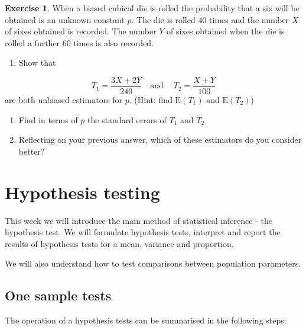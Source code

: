 \documentclass[
]{book}
\providecommand{\tightlist}{%
  \setlength{\itemsep}{0pt}\setlength{\parskip}{0pt}}
\theoremstyle{definition}
\theoremstyle{definition}
\theoremstyle{definition}
\newtheorem{exercise}{Exercise}[chapter]
\theoremstyle{definition}
\theoremstyle{remark}
\begin{document}
\begin{exercise}

When a biased cubical die is rolled the probability that a six will be obtained is an unknown constant \(p\). The die is rolled \(40\) times and the number \(X\) of sixes obtained is recorded. The number \(Y\) of sixes obtained when the die is rolled a further \(60\) times is also recorded.

\begin{enumerate}
\def\labelenumi{\alph{enumi})}
\tightlist
\item
  Show that
\end{enumerate}

\[T_1 = \frac{3X+2Y}{240} \ \ \ \text{    and  } \ \ \ \ T_2 = \frac{X+Y}{100} \]
are both unbiased estimators for \(p\).
(Hint: find \(\text{E}(T_1)\) and \(\text{E}(T_2)\))

\begin{enumerate}
\def\labelenumi{\alph{enumi})}
\setcounter{enumi}{1}
\item
  Find in terms of \(p\) the standard errors of \(T_1\) and \(T_2\)
\item
  Reflecting on your previous answer, which of these estimators do you consider better?
\end{enumerate}

\end{exercise}

\hypertarget{hypothesis-testing}{%
\chapter{Hypothesis testing}\label{hypothesis-testing}}

This week we will introduce the main method of statistical inference - the hypothesis test. We will formulate hypothesis tests, interpret and report the results of hypothesis tests for a mean, variance and proportion.

We will also understand how to test comparisons between population parameters.

\hypertarget{one-sample-tests}{%
\section{One sample tests}\label{one-sample-tests}}

The operation of a hypothesis tests can be summarised in the following steps:
\end{document}
